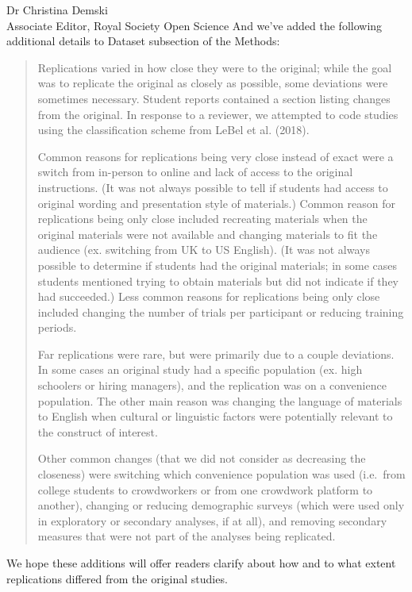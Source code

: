\documentclass{stanfordletter}
\newcommand{\revised}[1]{\begin{quote}	#1 \end{quote}}
\begin{document}
\begin{letter}{Dr Christina Demski \\ Associate Editor, Royal Society Open Science}
          And we've added the following additional details to Dataset subsection of the Methods:
          
          \revised{Replications varied in how close they were to the original; while the goal was to replicate the original as closely as possible, some deviations were sometimes necessary. Student reports contained a section listing changes from the original. In response to a reviewer, we attempted to code studies using the classification scheme from LeBel et al. (2018).
          	
          	
          	Common reasons for replications being very close instead of exact were a switch from in-person to online and lack of access to the original instructions. (It was not always possible to tell if students had access to original wording and presentation style of materials.) Common reason for replications being only close included recreating materials when the original materials were not available and changing materials to fit the audience (ex. switching from UK to US English). (It was not always possible to determine if students had the original materials; in some cases students mentioned trying to obtain materials but did not indicate if they had succeeded.) Less common reasons for replications being only close included changing the number of trials per participant or reducing training periods.
          	
          	
          	Far replications were rare, but were primarily due to a couple deviations. In some cases an original study had a specific population (ex. high schoolers or hiring managers), and the replication was on a convenience population. The other main reason was changing the language of materials to English when cultural or linguistic factors were potentially relevant to the construct of interest.
          	
          	
          	Other common changes (that we did not consider as decreasing the closeness) were switching which convenience population was used (i.e.~from college students to crowdworkers or from one crowdwork platform to another), changing or reducing demographic surveys (which were used only in exploratory or secondary analyses, if at all), and removing secondary measures that were not part of the analyses being replicated.}
         
         We hope these additions will offer readers clarify about how and to what extent replications differed from the original studies. 
          


\end{letter}
\end{document}
